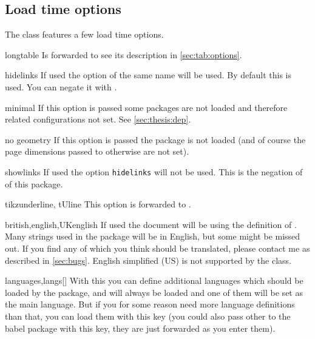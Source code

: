 \subsection{Load time options}\label{sec:thesis:opt}%
The class features a few load time options.
\begin{describeopt}{longtable}
  Is forwarded to  see its description in \autoref{sec:tab:options}.
\end{describeopt}
\begin{describeopt}{hidelinks}
  If used the  option of the same name will be used. By default
  this is used. You can negate it with .
\end{describeopt}
\begin{describeopt}{minimal}
  If this option is passed some packages are not loaded and therefore related
  configurations not set. See \autoref{sec:thesis:dep}.
\end{describeopt}
\begin{describeopt}{no geometry}
  If this option is passed the  package is not loaded (and of
  course the page dimensions passed to  otherwise are not set).
\end{describeopt}
\begin{describeopt}{showlinks}
  If used the  option \verb|hidelinks| will not be used. This is
  the negation of  of this package.
\end{describeopt}
\begin{describeopt}{tikzunderline, tUline}
  This option is forwarded to .
\end{describeopt}
\begin{describeopt}{british,english,UKenglish}
  If used the document will be using the  definition of
  . Many strings used in the package will be in English, but some
  might be missed out. If you find any of which you think should be translated,
  please contact me as described in \autoref{sec:bugs}. English simplified (US)
  is not supported by the class.
\end{describeopt}
\begin{describeopt}{languages,langs}[]
  With this you can define additional languages which should be loaded by the
   package,  and  will always be loaded and
  one of them will be set as the main language. But if you for some reason need
  more language definitions than that, you can load them with this key (you
  could also pass other  to the babel package with this key, they
  are just forwarded as you enter them).
\end{describeopt}



